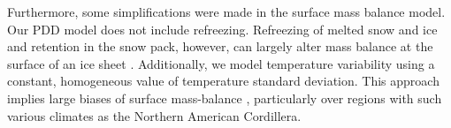 Furthermore, some simplifications were made in the surface mass balance model. Our PDD model does not include refreezing. Refreezing of melted snow and ice and retention in the snow pack, however, can largely alter mass balance at the surface of an ice sheet \citep{janssens-huybrechts-2000}. Additionally, we model temperature variability using a constant, homogeneous value of temperature standard deviation. This approach implies large biases of surface mass-balance \citep{charbit-etal-2013,rau-rogozhina-2013,seguinot-inreview}, particularly over regions with such various climates as the Northern American Cordillera.

